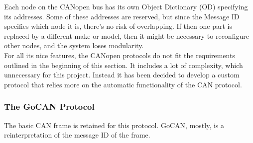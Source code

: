 Each node on the CANopen bus has its own Object Dictionary (OD) specifying its addresses. 
Some of these addresses are reserved, but since the Message ID specifies which node it is, there's no risk of overlapping.
If then one part is replaced by a different make or model, then it might be necessary to reconfigure other nodes, and the system loses modularity.\\

For all its nice features, the CANopen protocols do not fit the requirements outlined in the beginning of this section. 
It includes a lot of complexity, which unnecessary for this project.
Instead it has been decided to develop a custom protocol that relies more on the automatic functionality of the CAN protocol.\\

\subsubsection*{The GoCAN Protocol}
The basic CAN frame is retained for this protocol.
GoCAN, mostly, is a reinterpretation of the message ID of the frame.

